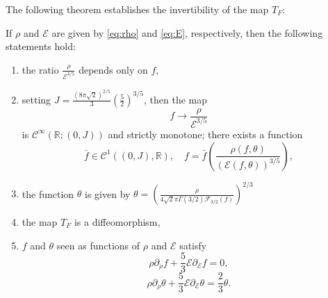 The following theorem establishes the invertibility of the map $T_F$:
\begin{theorem}\label{th:existence:new} If $\rho$ and $\mathcal E$ are given by \eqref{eq:rho} and \eqref{eq:E}, respectively, then the following statements hold: \begin{enumerate}\item
	the ratio $\frac{\rho}{\mathcal E^{3/5}}$ depends only on $f$, 
 \item setting $J=\frac{(8\pi\sqrt 2)^{2/5}}{3}\left(\frac 52 \right)^{3/5} $, then the map \[f\to\frac{\rho}{\mathcal E^{3/5}}\]is  $\mathcal C^\infty (\mathbb R; (0,J))$ and strictly monotone; there exists a function  
\begin{equation}\label{eq:f:bar}
\bar f\in \mathcal C^1((0,J),\mathbb R),\quad f=\bar f\left(\frac{\rho(f,\theta)}{(\mathcal E(f,\theta))^{3/5}}\right),
\end{equation}

\item the function $\theta$ is given by   
$	\theta = \left(\frac{\rho}{ 4\sqrt 2\pi\Gamma(3/2)\mathcal F_{3/2}(f)}\right)^{2/3} $


\item the map $T_F$ is a diffeomorphism,

\item $f$ and $\theta$ seen as functions of $\rho$ and $\mathcal E$ satisfy
\begin{equation}\label{eq:transp:f}\rho\partial_\rho f +\frac 53\mathcal E \partial_{\mathcal E}f=0, \end{equation}
\begin{equation}\label{eq:transp:theta}\rho\partial_\rho \theta +\frac 53\mathcal E \partial_{\mathcal E}\theta=\frac 23\theta.\end{equation}
\end{enumerate}
\end{theorem}
